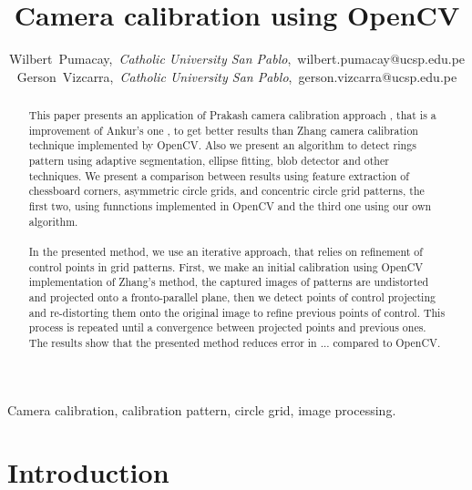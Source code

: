 \documentclass[journal]{IEEEtran}
\begin{document}
\title{Camera calibration using OpenCV}

\author{Wilbert~Pumacay,~\textit{Catholic University San Pablo},~wilbert.pumacay@ucsp.edu.pe\\
        Gerson~Vizcarra,~\textit{Catholic University San Pablo},~gerson.vizcarra@ucsp.edu.pe}

\maketitle

\begin{abstract}
This paper presents an application of Prakash camera calibration approach \cite{Prakash2012}, that is a improvement of Ankur's one \cite{Ankur2009}, to get better results than Zhang \cite{CameraCalibration1} camera calibration technique implemented by OpenCV. Also we present an algorithm to detect rings pattern using adaptive segmentation, ellipse fitting, blob detector and other techniques. We present a comparison between results using feature extraction of chessboard corners, asymmetric circle grids, and concentric circle grid patterns, the first two, using funnctions implemented in OpenCV and the third one using our own algorithm.
\\
\\
In the presented method, we use an iterative approach, that relies on refinement of control points in grid patterns. First, we make an initial calibration using OpenCV implementation of Zhang's method, the captured images of patterns are undistorted and projected onto a fronto-parallel plane, then we detect points of control projecting and re-distorting them onto the original image to refine previous points of control. This process is repeated until a convergence between projected points and previous ones. The results show that the presented method reduces error in ... compared to OpenCV.

\end{abstract}

\begin{IEEEkeywords}
Camera calibration, calibration pattern, circle grid, image processing.
\end{IEEEkeywords}


\section{Introduction}
\end{document}
